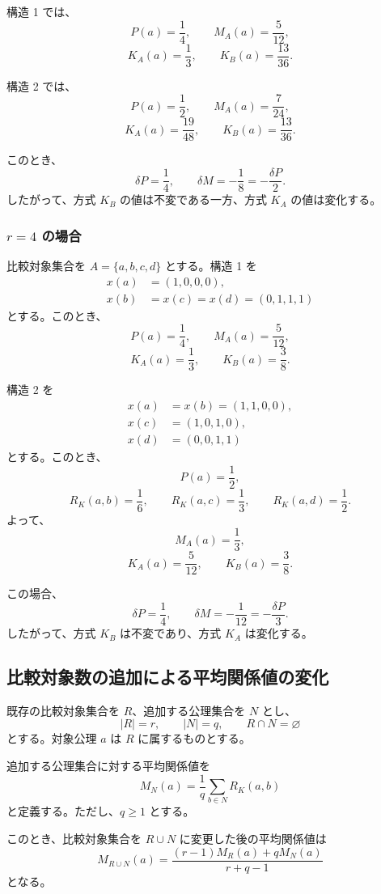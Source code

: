 \documentclass[a4paper,11pt]{ltjsarticle}
\begin{document}
構造 1 では、
\[
P(a)=\frac14,\qquad M_A(a)=\frac5{12},
\]
\[
K_A(a)=\frac13,\qquad K_B(a)=\frac{13}{36}.
\]

構造 2 では、
\[
P(a)=\frac12,\qquad M_A(a)=\frac7{24},
\]
\[
K_A(a)=\frac{19}{48},\qquad K_B(a)=\frac{13}{36}.
\]

このとき、
\[
\delta P=\frac14,\qquad
\delta M=-\frac18
=-\frac{\delta P}{2}.
\]
したがって、方式 $K_B$ の値は不変である一方、方式 $K_A$ の値は変化する。

\subsubsection{$r=4$ の場合}

比較対象集合を $A=\{a,b,c,d\}$ とする。構造 1 を
\[
\begin{aligned}
x(a)&=(1,0,0,0),\\
x(b)&=x(c)=x(d)=(0,1,1,1)
\end{aligned}
\]
とする。このとき、
\[
P(a)=\frac14,\qquad M_A(a)=\frac5{12},
\]
\[
K_A(a)=\frac13,\qquad K_B(a)=\frac38.
\]

構造 2 を
\[
\begin{aligned}
x(a)&=x(b)=(1,1,0,0),\\
x(c)&=(1,0,1,0),\\
x(d)&=(0,0,1,1)
\end{aligned}
\]
とする。このとき、
\[
P(a)=\frac12,
\]
\[
R_K(a,b)=\frac16,\qquad
R_K(a,c)=\frac13,\qquad
R_K(a,d)=\frac12.
\]
よって、
\[
M_A(a)=\frac13,
\]
\[
K_A(a)=\frac5{12},\qquad K_B(a)=\frac38.
\]

この場合、
\[
\delta P=\frac14,\qquad
\delta M=-\frac1{12}
=-\frac{\delta P}{3}.
\]
したがって、方式 $K_B$ は不変であり、方式 $K_A$ は変化する。

\subsection{比較対象数の追加による平均関係値の変化}

既存の比較対象集合を $R$、追加する公理集合を $N$ とし、
\[
|R|=r,\qquad |N|=q,\qquad R\cap N=\varnothing
\]
とする。対象公理 $a$ は $R$ に属するものとする。

追加する公理集合に対する平均関係値を
\[
M_N(a)=\frac1q\sum_{b\in N}R_K(a,b)
\]
と定義する。ただし、$q\geq1$ とする。

このとき、比較対象集合を $R\cup N$ に変更した後の平均関係値は
\[
\boxed{
M_{R\cup N}(a)=
\frac{(r-1)M_R(a)+qM_N(a)}{r+q-1}
}
\tag{10}
\]
となる。
\end{document}
